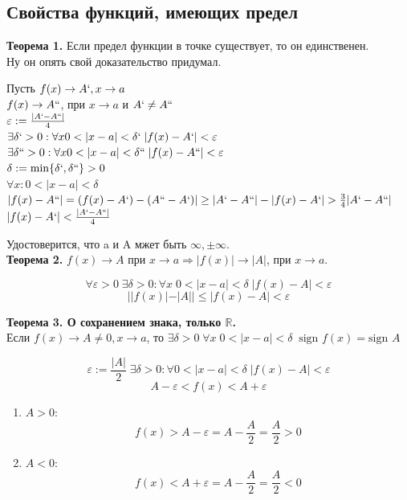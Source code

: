 \documentclass[12pt, a4paper]{article}
\newcommand{\R}{\mathbb{R}}
\newcommand{\eps}{\varepsilon}
\newcommand{\sign}{\text{sign\ }}
\begin{document}
\subsection{Свойства функций, имеющих предел}
\textbf{Теорема 1.} Если предел функции в точке существует, то он единственен. \\
Ну он опять свой доказательство придумал. 
\begin{tcolorbox}[title=Доказательство от противного]
	Пусть $f(x) \to A` , x \to a$\\
	$f(x) \to A``$, при $x \to a$ и $A` \not= A``$\\
	$\eps := \frac{|A` - A``|}{4}$\\
	$\exists \delta` > 0: \forall x 0 < |x - a| < \delta`\; |f(x) - A`| < \eps$\\
	$\exists \delta`` > 0: \forall x 0 < |x - a| < \delta``\; |f(x) - A``| < \eps$\\
	$ \delta := \min\{ \delta`, \delta`` \} > 0 $\\
	$ \forall x: 0 < |x - a| < \delta $\\
	$ |f(x) - A``| = (f(x) - A`) - (A`` - A`)| \geq |A` - A``| - |f(x) - A`| > \frac{3}{4} |A` - A``|$ \\
	$|f(x) - A`| < \frac{|A` - A``|}{4}$\\
\end{tcolorbox}
Удостоверится, что a и A мжет быть $\infty, \pm \infty$.\\
\textbf{Теорема 2.} $f(x) \to A$ при $x \to a \Rightarrow |f(x)| \to |A|$, при $x \to a$. 
\begin{tcolorbox}[title=Доказательство]
	\[ \forall \eps > 0\; \exists \delta > 0: \forall x\; 0 < |x - a| < \delta\; |f(x) - A| < \eps \]
	\[ ||f(x)| - |A|| \leq |f(x) - A| < \eps \]
\end{tcolorbox}
\textbf{Теорема 3. О сохранением знака, только $\R$.} \\
Если $f(x) \to A \not = 0, x \to a$, то $\exists \delta > 0\; \forall x\; 0 < |x - a| < \delta \;\; \sign f(x) = \sign A$
\begin{tcolorbox}[title=Доказательство. Непосредственная проверка.]
	\[ \eps := \frac{|A|}{2}\; \exists \delta > 0: \forall 0 < |x - a| < \delta\; |f(x) - A| < \eps \]
	\[ A - \eps < f(x) < A + \eps \]
	\begin{enumerate}
		\item $A > 0$:
			\[ f(x) > A - \eps = A - \frac{A}{2} = \frac{A}{2} > 0 \]
		\item $ A < 0 $:
			\[ f(x) < A + \eps = A - \frac{A}{2} = \frac{A}{2} < 0 \]
	\end{enumerate}
\end{tcolorbox}
\end{document}
